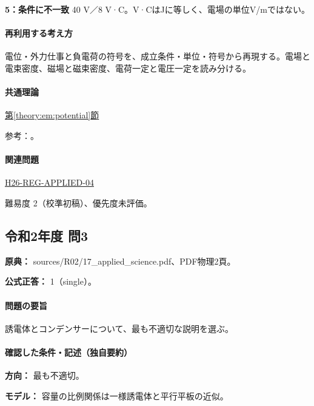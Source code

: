 \noindent\textbf{5：条件に不一致} 40 V／8 V·C。V·CはJに等しく、電場の単位V/mではない。\par

\paragraph{再利用する考え方} 電位・外力仕事と負電荷の符号を、成立条件・単位・符号から再現する。電場と電束密度、磁場と磁束密度、電荷一定と電圧一定を読み分ける。

\paragraph{共通理論} \hyperref[theory:em:potential]{第\ref*{theory:em:potential}節}

\par 参考：\cite{mit_em03}。

\paragraph{関連問題} \hyperref[q:h26-reg-applied-04]{H26-REG-APPLIED-04}

\par 難易度 2（校準初稿）、優先度未評価。

\subsection{令和2年度 問3}
\label{q:r02-reg-applied-03}

\noindent\textbf{原典：} sources/R02/17\_applied\_science.pdf、PDF物理2頁。

\textbf{公式正答：} 1（single）。

\paragraph{問題の要旨} 誘電体とコンデンサーについて、最も不適切な説明を選ぶ。

\paragraph{確認した条件・記述（独自要約）}\mbox{}\par

\noindent\textbf{方向：} 最も不適切。\par

\noindent\textbf{モデル：} 容量の比例関係は一様誘電体と平行平板の近似。\par

